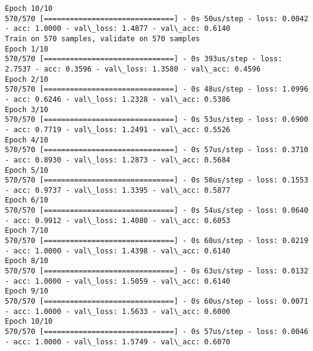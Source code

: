 \documentclass[11pt]{article}
\begin{document}
\begin{Verbatim}[commandchars=\\\{\}]
Epoch 10/10
570/570 [==============================] - 0s 50us/step - loss: 0.0042 - acc: 1.0000 - val\_loss: 1.4877 - val\_acc: 0.6140
Train on 570 samples, validate on 570 samples
Epoch 1/10
570/570 [==============================] - 0s 393us/step - loss: 2.7537 - acc: 0.3596 - val\_loss: 1.3580 - val\_acc: 0.4596
Epoch 2/10
570/570 [==============================] - 0s 48us/step - loss: 1.0996 - acc: 0.6246 - val\_loss: 1.2328 - val\_acc: 0.5386
Epoch 3/10
570/570 [==============================] - 0s 53us/step - loss: 0.6900 - acc: 0.7719 - val\_loss: 1.2491 - val\_acc: 0.5526
Epoch 4/10
570/570 [==============================] - 0s 57us/step - loss: 0.3710 - acc: 0.8930 - val\_loss: 1.2873 - val\_acc: 0.5684
Epoch 5/10
570/570 [==============================] - 0s 58us/step - loss: 0.1553 - acc: 0.9737 - val\_loss: 1.3395 - val\_acc: 0.5877
Epoch 6/10
570/570 [==============================] - 0s 54us/step - loss: 0.0640 - acc: 0.9912 - val\_loss: 1.4080 - val\_acc: 0.6053
Epoch 7/10
570/570 [==============================] - 0s 60us/step - loss: 0.0219 - acc: 1.0000 - val\_loss: 1.4398 - val\_acc: 0.6140
Epoch 8/10
570/570 [==============================] - 0s 63us/step - loss: 0.0132 - acc: 1.0000 - val\_loss: 1.5059 - val\_acc: 0.6140
Epoch 9/10
570/570 [==============================] - 0s 60us/step - loss: 0.0071 - acc: 1.0000 - val\_loss: 1.5633 - val\_acc: 0.6000
Epoch 10/10
570/570 [==============================] - 0s 57us/step - loss: 0.0046 - acc: 1.0000 - val\_loss: 1.5749 - val\_acc: 0.6070

    \end{Verbatim}
\end{document}

